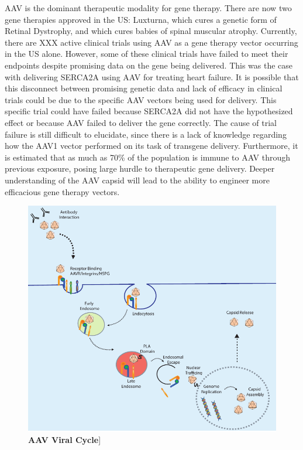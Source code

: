 AAV is the dominant therapeutic modality for gene therapy. There are now two gene therapies approved in the US: Luxturna\cite{Russell2017-so}, which cures a genetic form of Retinal Dystrophy, and  which cures babies of spinal muscular atrophy\cite{Mendell2017-ja}. Currently, there are XXX active clinical trials using AAV as a gene therapy vector occurring in the US alone. However, some of these clinical trials have failed to meet their endpoints despite promising data on the gene being delivered. This was the case with delivering SERCA2A using AAV for treating heart failure\cite{Rincon2015-ep}. It is possible that this disconnect between promising genetic data and lack of efficacy in clinical trials could be due to the specific AAV vectors being used for delivery. This specific trial could have failed because SERCA2A did not have the hypothesized effect or because AAV failed to deliver the gene correctly. The cause of trial failure is still difficult to elucidate, since there is a lack of knowledge regarding how the AAV1 vector performed on its task of transgene delivery. Furthermore, it is estimated that as much as 70\% of the population is immune to AAV through previous exposure, posing large hurdle to therapeutic gene delivery\cite{Calcedo2009-zx}. Deeper understanding of the AAV capsid will lead to the ability to engineer more efficacious gene therapy vectors.

\begin{figure}[t!]
\includegraphics[width=\textwidth]{figures/20190612_aav_cell_diagram.pdf}
\caption[AAV Viral Cycle]{\textbf{AAV Viral Cycle}]
\label{fig:Figure 0.1}}
\end{figure}

